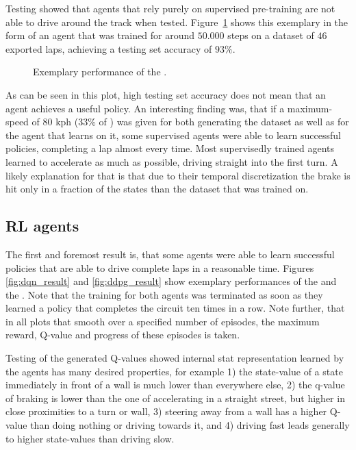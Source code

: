 Testing showed that agents that rely purely on supervised pre-training are not able to drive around the track when tested. Figure~\ref{fig:sv_result} shows this exemplary in the form of an agent that was trained for around $50.000$ steps on a dataset of $46$ exported laps, achieving a testing set accuracy of $93\%$.

\begin{figure}[h]
	{%
		\setlength{\fboxsep}{0pt}%
		\setlength{\fboxrule}{1pt}%
	}%
	\centering
	\caption[Exemplary performance of the ]{Exemplary performance of the .}
	\label{fig:sv_result}
\end{figure}

As can be seen in this plot, high testing set accuracy does not mean that an agent achieves a useful policy. An interesting finding was, that if a maximum-speed of $80$ kph ($33\%$ of ) was given for both generating the dataset as well as for the agent that learns on it, some supervised agents were able to learn successful policies, completing a lap almost every time. Most supervisedly trained agents learned to accelerate as much as possible, driving straight into the first turn. A likely explanation for that is that due to their temporal discretization the brake is hit only in a fraction of the states than the dataset that was trained on. 

\subsection{RL agents}

The first and foremost result is, that some agents were able to learn successful policies that are able to drive complete laps in a reasonable time. Figures \ref{fig:dqn_result} and \ref{fig:ddpg_result} show exemplary performances of the  and the . Note that the training for both agents was terminated as soon as they learned a policy that completes the circuit ten times in a row. Note further, that in all plots that smooth over a specified number of episodes, the maximum reward, Q-value and progress of these episodes is taken.

Testing of the generated Q-values showed internal stat representation learned by the agents has many desired properties, for example 1) the state-value of a state immediately in front of a wall is much lower than everywhere else, 2) the q-value of braking is lower than the one of accelerating in a straight street, but higher in close proximities to a turn or wall, 3) steering away from a wall has a higher Q-value than doing nothing or driving towards it, and 4) driving fast leads generally to higher state-values than driving slow. 

